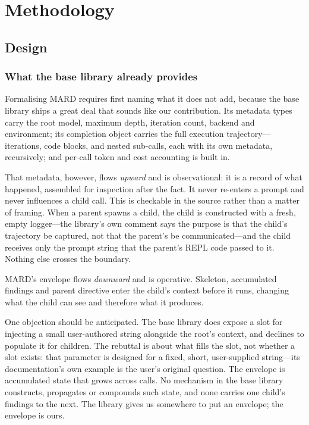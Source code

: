 \documentclass[conference]{IEEEtran}
\begin{document}
\section{Methodology}
\label{sec:method}

\subsection{Design}
\label{sec:design}

\subsubsection{What the base library already provides}
\label{sec:baselib}
Formalising MARD requires first naming what it does not add, because the base
library ships a great deal that sounds like our contribution. Its metadata
types carry the root model, maximum depth, iteration count, backend and
environment; its completion object carries the full execution
trajectory---iterations, code blocks, and nested sub-calls, each with its own
metadata, recursively; and per-call token and cost accounting is built in.

That metadata, however, flows \emph{upward} and is observational: it is a
record of what happened, assembled for inspection after the fact. It never
re-enters a prompt and never influences a child call. This is checkable in
the source rather than a matter of framing. When a parent spawns a child, the
child is constructed with a fresh, empty logger---the library's own comment
says the purpose is that the child's trajectory be captured, not that the
parent's be communicated---and the child receives only the prompt string that
the parent's REPL code passed to it. Nothing else crosses the boundary.

MARD's envelope flows \emph{downward} and is operative. Skeleton, accumulated
findings and parent directive enter the child's context before it runs,
changing what the child can see and therefore what it produces.

One objection should be anticipated. The base library does expose a slot for
injecting a small user-authored string alongside the root's context, and
declines to populate it for children. The rebuttal is about what fills the
slot, not whether a slot exists: that parameter is designed for a fixed,
short, user-supplied string---its documentation's own example is the user's
original question. The envelope is accumulated state that grows across calls.
No mechanism in the base library constructs, propagates or compounds such
state, and none carries one child's findings to the next. The library gives
us somewhere to put an envelope; the envelope is ours.
\end{document}
